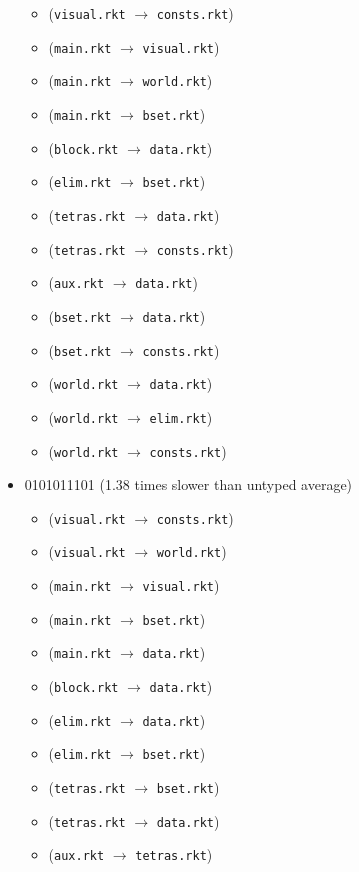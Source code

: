 \documentclass{article}
\newcommand{\mono}[1]{\texttt{#1}}
\begin{document}
\begin{itemize}
\begin{itemize}
  \item (\mono{visual.rkt} $\rightarrow$ \mono{consts.rkt})
  \item (\mono{main.rkt} $\rightarrow$ \mono{visual.rkt})
  \item (\mono{main.rkt} $\rightarrow$ \mono{world.rkt})
  \item (\mono{main.rkt} $\rightarrow$ \mono{bset.rkt})
  \item (\mono{block.rkt} $\rightarrow$ \mono{data.rkt})
  \item (\mono{elim.rkt} $\rightarrow$ \mono{bset.rkt})
  \item (\mono{tetras.rkt} $\rightarrow$ \mono{data.rkt})
  \item (\mono{tetras.rkt} $\rightarrow$ \mono{consts.rkt})
  \item (\mono{aux.rkt} $\rightarrow$ \mono{data.rkt})
  \item (\mono{bset.rkt} $\rightarrow$ \mono{data.rkt})
  \item (\mono{bset.rkt} $\rightarrow$ \mono{consts.rkt})
  \item (\mono{world.rkt} $\rightarrow$ \mono{data.rkt})
  \item (\mono{world.rkt} $\rightarrow$ \mono{elim.rkt})
  \item (\mono{world.rkt} $\rightarrow$ \mono{consts.rkt})
  \end{itemize}
\item 0101011101 (1.38 times slower than untyped average)
  \begin{itemize}
  \item (\mono{visual.rkt} $\rightarrow$ \mono{consts.rkt})
  \item (\mono{visual.rkt} $\rightarrow$ \mono{world.rkt})
  \item (\mono{main.rkt} $\rightarrow$ \mono{visual.rkt})
  \item (\mono{main.rkt} $\rightarrow$ \mono{bset.rkt})
  \item (\mono{main.rkt} $\rightarrow$ \mono{data.rkt})
  \item (\mono{block.rkt} $\rightarrow$ \mono{data.rkt})
  \item (\mono{elim.rkt} $\rightarrow$ \mono{data.rkt})
  \item (\mono{elim.rkt} $\rightarrow$ \mono{bset.rkt})
  \item (\mono{tetras.rkt} $\rightarrow$ \mono{bset.rkt})
  \item (\mono{tetras.rkt} $\rightarrow$ \mono{data.rkt})
  \item (\mono{aux.rkt} $\rightarrow$ \mono{tetras.rkt})

\end{itemize}
\end{itemize}
\end{document}
